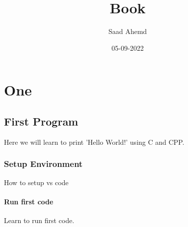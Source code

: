 \documentclass[a4paper,12pt]{book}
\title{Book}
\author{Saad Ahemd}
\date{05-09-2022}
\begin{document}
\maketitle
\newpage
\tableofcontents
\newpage
\chapter{One}
\section{First Program}
Here we will learn to print 'Hello World!' using C and CPP.
\subsection{Setup Environment}
How to setup vs code
\subsubsection{Run first code}
Learn to run first code.
\end{document}

